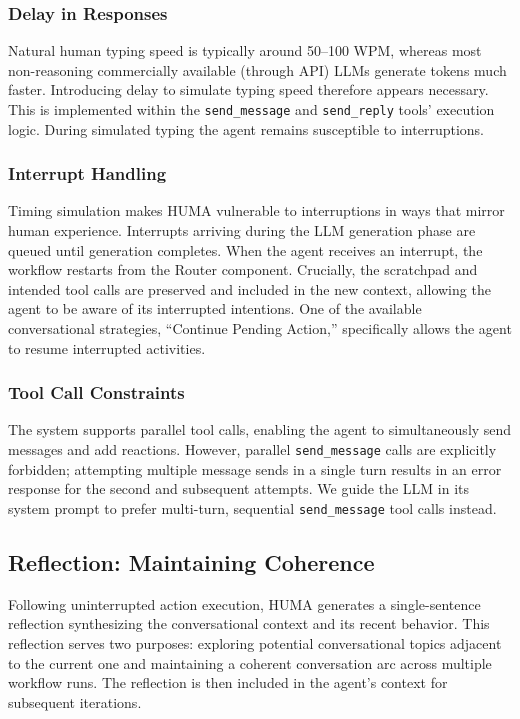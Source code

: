 \documentclass[twocolumn,10pt]{article}
\begin{document}
\subsubsection{Delay in Responses}

Natural human typing speed is typically around 50–100 WPM, whereas most non-reasoning commercially available (through API) LLMs generate tokens much faster. Introducing delay to simulate typing speed therefore appears necessary. This is implemented within the \texttt{send\_message} and \texttt{send\_reply} tools' execution logic. During simulated typing the agent remains susceptible to interruptions.

\subsubsection{Interrupt Handling}

Timing simulation makes HUMA vulnerable to interruptions in ways that mirror human experience. Interrupts arriving during the LLM generation phase are queued until generation completes. When the agent receives an interrupt, the workflow restarts from the Router component. Crucially, the scratchpad and intended tool calls are preserved and included in the new context, allowing the agent to be aware of its interrupted intentions. One of the available conversational strategies, ``Continue Pending Action,'' specifically allows the agent to resume interrupted activities.

\subsubsection{Tool Call Constraints}

The system supports parallel tool calls, enabling the agent to simultaneously send messages and add reactions. However, parallel \texttt{send\_message} calls are explicitly forbidden; attempting multiple message sends in a single turn results in an error response for the second and subsequent attempts. We guide the LLM in its system prompt to prefer multi-turn, sequential \texttt{send\_message} tool calls instead.

\subsection{Reflection: Maintaining Coherence}
\label{subsec:reflection}

Following uninterrupted action execution, HUMA generates a single-sentence reflection synthesizing the conversational context and its recent behavior. This reflection serves two purposes: exploring potential conversational topics adjacent to the current one and maintaining a coherent conversation arc across multiple workflow runs. The reflection is then included in the agent's context for subsequent iterations.
\end{document}
